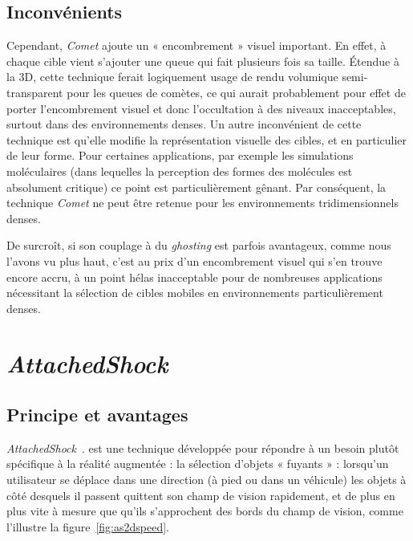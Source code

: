 	\subsection{Inconvénients}
	Cependant, \emph{Comet} ajoute un « encombrement » visuel important. En effet, à chaque cible vient s'ajouter une queue qui fait plusieurs fois sa taille. Étendue à la 3D, cette technique ferait logiquement usage de rendu volumique semi-transparent pour les queues de comètes, ce qui aurait probablement pour effet de porter l'encombrement visuel et donc l'occultation à des niveaux inacceptables, surtout dans des environnements denses. Un autre inconvénient de cette technique est qu'elle modifie la représentation visuelle des cibles, et en particulier de leur forme. Pour certaines applications, par exemple les simulations moléculaires (dans lequelles la perception des formes des molécules est absolument critique) ce point est particulièrement gênant. Par conséquent, la technique \emph{Comet} ne peut être retenue pour les environnements tridimensionnels denses.

	De surcroît, si son couplage à du \emph{ghosting} est parfois avantageux, comme nous l'avons vu plus haut, c'est au prix d'un encombrement visuel qui s'en trouve encore accru, à un point hélas inacceptable pour de nombreuses applications nécessitant la sélection de cibles mobiles en environnements particulièrement denses.

\section{\emph{AttachedShock}}
	\subsection{Principe et avantages}
	\emph{AttachedShock}~\cite{you2012attachedshock, you2014attachedshock}. est une technique développée pour répondre à un besoin plutôt spécifique à la réalité augmentée : la sélection d'objets « fuyants » : lorsqu'un utilisateur se déplace dans une direction (à pied ou dans un véhicule) les objets à côté desquels il passent quittent son champ de vision rapidement, et de plus en plus vite à mesure que qu'ils s'approchent des bords du champ de vision, comme l'illustre la figure~\ref{fig:as2dspeed}.
	
